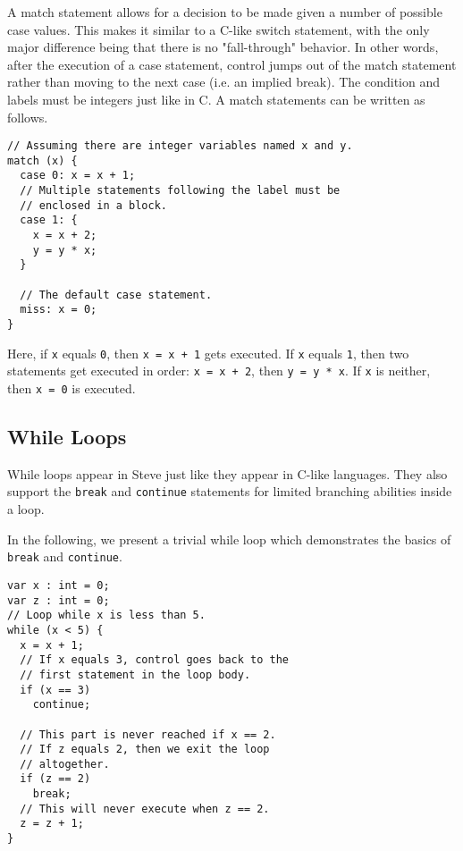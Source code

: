 A match statement allows for a decision to be made given a number of possible case values. This makes it similar to a C-like switch statement, with the only major difference being that there is no "fall-through" behavior. In other words, after the execution of a case statement, control jumps out of the match statement rather than moving to the next case (i.e. an implied break). The condition and labels must be integers just like in C. A match statements can be written as follows.

\begin{codepage}
\begin{lstlisting}
// Assuming there are integer variables named x and y.
match (x) {
  case 0: x = x + 1;
  // Multiple statements following the label must be 
  // enclosed in a block.
  case 1: {
    x = x + 2;
    y = y * x;
  }
  
  // The default case statement.
  miss: x = 0;
}
\end{lstlisting}
\end{codepage}

Here, if \texttt{x} equals \texttt{0}, then \texttt{x = x + 1} gets executed. If \texttt{x} equals \texttt{1}, then two statements get executed in order: \texttt{x = x + 2}, then \texttt{y = y * x}. If \texttt{x} is neither, then \texttt{x = 0} is executed.

\subsection{While Loops} \label{tut:while}

While loops appear in Steve just like they appear in C-like languages. They also support the \texttt{break} and \texttt{continue} statements for limited branching abilities inside a loop.

In the following, we present a trivial while loop which demonstrates the basics of \texttt{break} and \texttt{continue}.

\begin{codepage}
\begin{lstlisting}
var x : int = 0;
var z : int = 0;
// Loop while x is less than 5.
while (x < 5) {
  x = x + 1;
  // If x equals 3, control goes back to the
  // first statement in the loop body.
  if (x == 3)
    continue;
    
  // This part is never reached if x == 2.
  // If z equals 2, then we exit the loop
  // altogether.
  if (z == 2) 
    break;
  // This will never execute when z == 2.
  z = z + 1;
}
\end{lstlisting}
\end{codepage}

